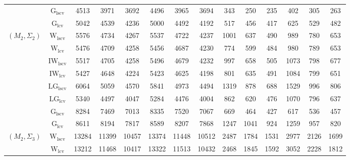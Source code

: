 \begin{table}[!ht]
{\begin{tabular}{@{}cc|ccc|ccc|ccc|ccc@{}}
 & $\mathrm{G}_{\mathrm{lscv}}$ & 4513 & 3971 & 3692 & 4496 & 3965 & 3694 & \cellcolor{black!30}343 & \cellcolor{black!30}250 & \cellcolor{black!30}235 & \cellcolor{black!30}402 & \cellcolor{black!30}305 & \cellcolor{black!30}263 \\ 
 & $\mathrm{G}_{\mathrm{lcv}}$ & 5042 & 4539 & 4236 & 5000 & 4492 & 4192 & 517 & 456 & 417 & \cellcolor{black!10}625 & 529 & 482 \\ 
\midrule
$(M_2,\Sigma_2)$ & $\mathrm{W}_{\mathrm{lscv}}$ & 5576 & 4734 & 4267 & 5537 & 4722 & 4237 & 1001 & 637 & 490 & 989 & \cellcolor{black!10}780 & 653 \\ 
 & $\mathrm{W}_{\mathrm{lcv}}$ & 5476 & 4709 & 4258 & 5456 & 4687 & 4230 & \cellcolor{black!10}774 & \cellcolor{black!10}599 & 484 & \cellcolor{black!10}980 & 789 & 653 \\ 
 & $\mathrm{IW}_{\mathrm{lscv}}$ & 5517 & 4705 & 4258 & 5496 & 4679 & 4232 & 997 & 658 & 505 & 1073 & 798 & 677 \\ 
 & $\mathrm{IW}_{\mathrm{lcv}}$ & \cellcolor{black!10}5427 & \cellcolor{black!10}4648 & \cellcolor{black!10}4224 & \cellcolor{black!10}5423 & \cellcolor{black!10}4625 & \cellcolor{black!10}4198 & 801 & 635 & 491 & 1084 & 799 & 651 \\ 
 & $\mathrm{LG}_{\mathrm{lscv}}$ & 6064 & 5059 & 4570 & 5841 & 4973 & 4494 & 1319 & 878 & 688 & 1529 & 996 & 806 \\ 
 & $\mathrm{LG}_{\mathrm{lcv}}$ & \cellcolor{black!30}5340 & \cellcolor{black!30}4497 & \cellcolor{black!30}4047 & \cellcolor{black!30}5284 & \cellcolor{black!30}4476 & \cellcolor{black!30}4004 & 862 & 620 & \cellcolor{black!10}476 & 1070 & 796 & \cellcolor{black!10}637 \\ 
 & $\mathrm{G}_{\mathrm{lscv}}$ & 8284 & 7469 & 7013 & 8335 & 7520 & 7067 & \cellcolor{black!30}669 & \cellcolor{black!30}464 & \cellcolor{black!30}427 & \cellcolor{black!30}617 & \cellcolor{black!30}536 & \cellcolor{black!30}457 \\ 
 & $\mathrm{G}_{\mathrm{lcv}}$ & 8611 & 8194 & 7817 & 8589 & 8207 & 7868 & 1247 & 1041 & 924 & 1259 & 957 & 820 \\ 
\midrule
$(M_2,\Sigma_3)$ & $\mathrm{W}_{\mathrm{lscv}}$ & 13284 & 11399 & 10457 & 13374 & 11448 & 10512 & \cellcolor{black!10}2487 & \cellcolor{black!30}1784 & \cellcolor{black!30}1531 & \cellcolor{black!30}2977 & \cellcolor{black!30}2126 & \cellcolor{black!30}1699 \\ 
 & $\mathrm{W}_{\mathrm{lcv}}$ & 13212 & 11468 & 10417 & 13322 & 11513 & 10432 & \cellcolor{black!30}2468 & \cellcolor{black!10}1845 & \cellcolor{black!10}1592 & \cellcolor{black!10}3052 & \cellcolor{black!10}2228 & 1812 \\ 

\end{tabular}}
\end{table}
